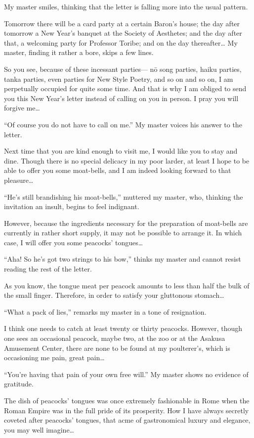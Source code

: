 \documentclass[12pt, openright]{book}
\begin{document}
My master smiles, thinking that the letter is falling more into the
usual pattern.

Tomorrow there will be a card party at a certain Baron's house; the day
after tomorrow a New Year's banquet at the Society of Aesthetes; and the
day after that, a welcoming party for Professor Toribe; and on the day
thereafter\ldots{} My master, finding it rather a bore, skips a few
lines.

So you see, because of these incessant parties--- nō song parties, haiku
parties, tanka parties, even parties for New Style Poetry, and so on and
so on, I am perpetually occupied for quite some time. And that is why I
am obliged to send you this New Year's letter instead of calling on you
in person. I pray you will forgive me\ldots{}

``Of course you do not have to call on me.'' My master voices his answer
to the letter.

Next time that you are kind enough to visit me, I would like you to stay
and dine. Though there is no special delicacy in my poor larder, at
least I hope to be able to offer you some moat-bells, and I am indeed
looking forward to that pleasure\ldots{}

``He's still brandishing his moat-bells,'' muttered my master, who,
thinking the invitation an insult, begins to feel indignant.

However, because the ingredients necessary for the preparation of
moat-bells are currently in rather short supply, it may not be possible
to arrange it. In which case, I will offer you some peacocks'
tongues\ldots{}

``Aha! So he's got two strings to his bow,'' thinks my master and cannot
resist reading the rest of the letter.

As you know, the tongue meat per peacock amounts to less than half the
bulk of the small finger. Therefore, in order to satisfy your gluttonous
stomach\ldots{}

``What a pack of lies,'' remarks my master in a tone of resignation.

I think one needs to catch at least twenty or thirty peacocks. However,
though one sees an occasional peacock, maybe two, at the zoo or at the
Asakusa Amusement Center, there are none to be found at my poulterer's,
which is occasioning me pain, great pain\ldots{}

``You're having that pain of your own free will.'' My master shows no
evidence of gratitude.

The dish of peacocks' tongues was once extremely fashionable in Rome
when the Roman Empire was in the full pride of its prosperity. How I
have always secretly coveted after peacocks' tongues, that acme of
gastronomical luxury and elegance, you may well imagine\ldots{}
\end{document}
